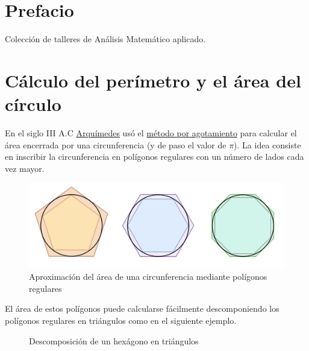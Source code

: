 \documentclass[
  a4paper,
]{scrreport}
\begin{document}
\hypertarget{prefacio}{%
\chapter*{Prefacio}\label{prefacio}}


Colección de talleres de Análisis Matemático aplicado.


\hypertarget{cuxe1lculo-del-peruxedmetro-y-el-uxe1rea-del-cuxedrculo}{%
\chapter{Cálculo del perímetro y el área del
círculo}\label{cuxe1lculo-del-peruxedmetro-y-el-uxe1rea-del-cuxedrculo}}

En el siglo III A.C
\href{https://es.wikipedia.org/wiki/Arqu\%C3\%ADmedes}{Arquímedes} usó
el
\href{https://es.wikipedia.org/wiki/M\%C3\%A9todo_por_agotamiento}{método
por agotamiento} para calcular el área encerrada por una circunferencia
(y de paso el valor de \(\pi\)). La idea consiste en inscribir la
circunferencia en polígonos regulares con un número de lados cada vez
mayor.

\begin{figure}

{\centering \includegraphics{img/area-circulo/poligonos-circunferencia.png}

}

\caption{Aproximación del área de una circunferencia mediante polígonos
regulares}

\end{figure}

El área de estos polígonos puede calcularse fácilmente descomponiendo
los polígonos regulares en triángulos como en el siguiente ejemplo.

\begin{figure}

{\centering 



}

\caption{Descomposición de un hexágono en triángulos}

\end{figure}
\end{document}
